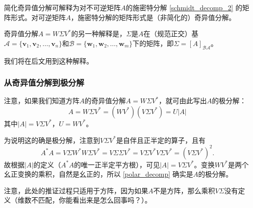 简化奇异值分解可解释为对不可逆矩阵$A$的施密特分解 \eqref{schmidt_decomp_2} 的矩阵形式。对可逆矩阵$A$，施密特分解的矩阵形式是（非简化的）奇异值分解。

\begin{remark}\label{remark:Singular_orthonormal_diag}
    奇异值分解$A=W\Sigma V^*$的另一种解释是，$\Sigma$是$A$在（规范正交）基$\mathcal{A}=\{\mathbf{v}_{1},\mathbf{v}_{2},\ldots,\mathbf{v}_{n}\}$和$\mathcal{B}=\{\mathbf{w}_{1},\mathbf{w}_{2},\ldots,\mathbf{w}_{m}\}$下的矩阵，即$\Sigma=[A]_\mathcal{BA}$。

    我们将在后文用到这种解释。
\end{remark}

\subsubsection{从奇异值分解到极分解}

注意，如果我们知道方阵$A$的奇异值分解$A=W\Sigma V^*$，就可由此写出$A$的极分解：
\begin{equation}\label{polar_decomp}
    A=W\Sigma V^*=(W V^*)(V\Sigma V^*)=U|A|
\end{equation}
其中$|A|=V\Sigma V^*$，$U=W V^*$。

为说明这的确是极分解，注意到$V\Sigma V^*$是自伴且正半定的算子，且有
\[A^*A=V\Sigma W^*W\Sigma V^*=V\Sigma\Sigma V^*=V\Sigma V^*V\Sigma V^*=(V\Sigma V^*)^2.\]
故根据$|A|$的定义（$A^*A$的唯一正半定平方根），可见$|A|=V\Sigma V^*$。变换$WV^*$是两个幺正变换的乘积，自然是幺正的，所以 \eqref{polar_decomp} 确实是$A$的极分解。

注意，此处的推证过程只适用于方阵，因为如果$A$不是方阵，那么乘积$V\Sigma$没有定义（维数不匹配，你能看出来是怎么回事吗？）。

